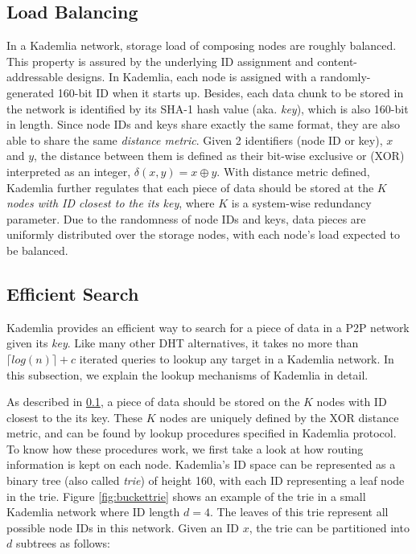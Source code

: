 \subsection{Load Balancing}
\label{ss:loadbalancing}
In a Kademlia network, storage load of composing nodes are roughly balanced. This property is assured by the underlying ID assignment and content-addressable designs. In Kademlia, each node is assigned with a randomly-generated 160-bit ID when it starts up. Besides, each data chunk to be stored in the network is identified by its SHA-1 hash value (aka. \textit{key}), which is also 160-bit in length. Since node IDs and keys share exactly the same format, they are also able to share the same \textit{distance metric}. Given 2 identifiers (node ID or key), $x$ and $y$, the distance between them is defined as their bit-wise exclusive or (XOR) interpreted as an integer, $\delta(x,y)=x \oplus y$. With distance metric defined, Kademlia further regulates that each piece of data should be stored at the \textit{$K$ nodes with ID closest to the its key}, where $K$ is a system-wise redundancy parameter. Due to the randomness of node IDs and keys, data pieces are uniformly distributed over the storage nodes, with each node's load expected to be balanced.

\subsection{Efficient Search}
\label{ss:efficientsearch}

Kademlia provides an efficient way to search for a piece of data in a P2P network given its \textit{key}. Like many other DHT alternatives, it takes no more than $\lceil log(n) \rceil + c$ iterated queries to lookup any target in a Kademlia network. In this subsection, we explain the lookup mechanisms of Kademlia in detail.

As described in \ref{ss:loadbalancing}, a piece of data should be stored on the $K$ nodes with ID closest to the its key. These $K$ nodes are uniquely defined by the XOR distance metric, and can be found by lookup procedures specified in Kademlia protocol. To know how these procedures work, we first take a look at how routing information is kept on each node. Kademlia's ID space can be represented as a binary tree (also called \textit{trie}) of height 160, with each ID representing a leaf node in the trie. Figure \ref{fig:buckettrie} shows an example of the trie in a small Kademlia network where ID length $d = 4$. The leaves of this trie represent all possible node IDs in this network. Given an ID $x$, the trie can be partitioned into $d$ subtrees as follows:

